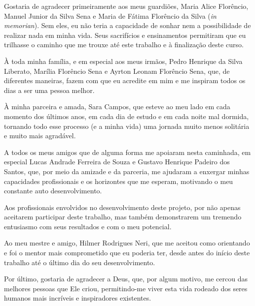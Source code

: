 \begin{agradecimentos}
Gostaria de agradecer primeiramente aos meus guardiões, Maria Alice Florêncio, Manuel Junior da Silva Sena e Maria de Fátima Florêncio da Silva (\textit{in memorian}). Sem eles, eu não teria a capacidade de sonhar nem a possibilidade de realizar nada em minha vida. Seus sacrifícios e ensinamentos permitiram que eu trilhasse o caminho que me trouxe até este trabalho e à finalização deste curso.

À toda minha família, e em especial aos meus irmãos, Pedro Henrique da Silva Liberato, Marília Florêncio Sena e Ayrton Leonam Florêncio Sena, que, de diferentes maneiras, fazem com que eu acredite em mim e me inspiram todos os dias a ser uma pessoa melhor.

À minha parceira e amada, Sara Campos, que esteve ao meu lado em cada momento dos últimos anos, em cada dia de estudo e em cada noite mal dormida, tornando todo esse processo (e a minha vida) uma jornada muito menos solitária e muito mais agradável.

A todos os meus amigos que de alguma forma me apoiaram nesta caminhada, em especial Lucas Andrade Ferreira de Souza e Gustavo Henrique Padeiro dos Santos, que, por meio da amizade e da parceria, me ajudaram a enxergar minhas capacidades profissionais e os horizontes que me esperam, motivando o meu constante auto desenvolvimento.

Aos profissionais envolvidos no desenvolvimento deste projeto, por não apenas aceitarem participar deste trabalho, mas também demonstrarem um tremendo entusiasmo com seus resultados e com o meu potencial.

Ao meu mestre e amigo, Hilmer Rodrigues Neri, que me aceitou como orientando e foi o mentor mais comprometido que eu poderia ter, desde antes do início deste trabalho até o último dia do seu desenvolvimento.

Por último, gostaria de agradecer a Deus, que, por algum motivo, me cercou das melhores pessoas que Ele criou, permitindo-me viver esta vida rodeado dos seres humanos mais incríveis e inspiradores existentes.
\end{agradecimentos}
